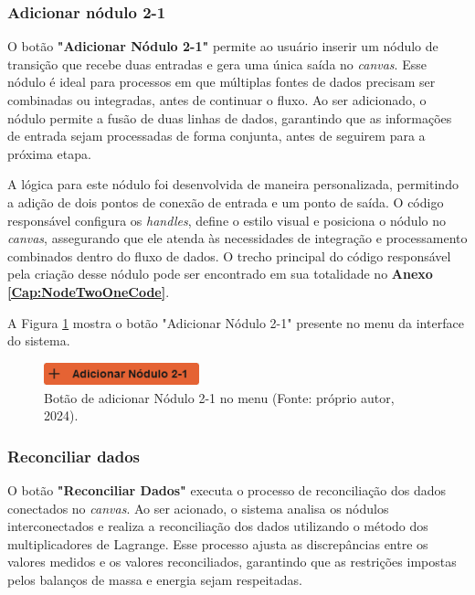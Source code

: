 \subsubsection{Adicionar nódulo 2-1}

O botão \textbf{"Adicionar Nódulo 2-1"} permite ao usuário inserir um nódulo de transição que recebe duas entradas e gera uma única saída no \textit{canvas}. Esse nódulo é ideal para processos em que múltiplas fontes de dados precisam ser combinadas ou integradas, antes de continuar o fluxo. Ao ser adicionado, o nódulo permite a fusão de duas linhas de dados, garantindo que as informações de entrada sejam processadas de forma conjunta, antes de seguirem para a próxima etapa.

A lógica para este nódulo foi desenvolvida de maneira personalizada, permitindo a adição de dois pontos de conexão de entrada e um ponto de saída. O código responsável configura os \textit{handles}, define o estilo visual e posiciona o nódulo no \textit{canvas}, assegurando que ele atenda às necessidades de integração e processamento combinados dentro do fluxo de dados. O trecho principal do código responsável pela criação desse nódulo pode ser encontrado em sua totalidade no \textbf{Anexo \ref{Cap:NodeTwoOneCode}}.

A Figura \ref{Fig:AddNodeTwoOneButton} mostra o botão "Adicionar Nódulo 2-1" presente no menu da interface do sistema.

\begin{figure}[htbp]
    \centering
    \includegraphics[width=0.4\textwidth]{figuras/add-node21-button.png}
    \caption{Botão de adicionar Nódulo 2-1 no menu (Fonte: próprio autor, 2024).}
    \label{Fig:AddNodeTwoOneButton}
\end{figure}

\subsubsection{Reconciliar dados}

O botão \textbf{"Reconciliar Dados"} executa o processo de reconciliação dos dados conectados no \textit{canvas}. Ao ser acionado, o sistema analisa os nódulos interconectados e realiza a reconciliação dos dados utilizando o método dos multiplicadores de Lagrange. Esse processo ajusta as discrepâncias entre os valores medidos e os valores reconciliados, garantindo que as restrições impostas pelos balanços de massa e energia sejam respeitadas.


